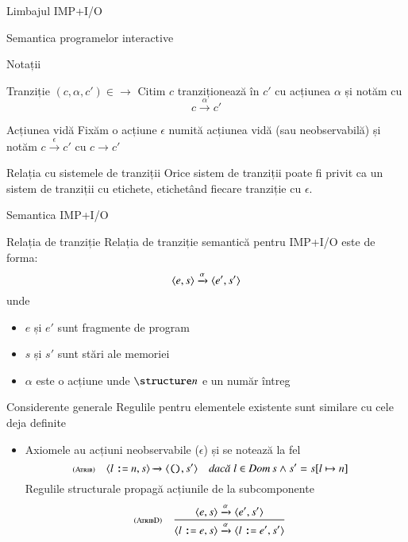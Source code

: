 \documentclass[xcolor=pdftex,romanian,colorlinks]{beamer}
\begin{document}
\begin{section}{Limbajul IMP+I/O}
\begin{subsection}{Semantica programelor interactive}
\begin{frame}{Notații}
\begin{block}{Tranziție $(c,\alpha,c') \in \rightarrow$} 
Citim $c$ tranziționează în $c'$ cu acțiunea $\alpha$ și notăm cu
\[c \xrightarrow{\alpha} c'\]
\end{block}

\begin{block}{Acțiunea vidă}
Fixăm o acțiune $\epsilon$ numită acțiunea vidă (sau neobservabilă) și notăm  $c \xrightarrow{\epsilon} c'$ cu $c \rightarrow c'$
\end{block}

\begin{block}{Relația cu sistemele de tranziții}
Orice sistem de tranziții poate fi privit ca un sistem de tranziții cu etichete, etichetând fiecare tranziție cu $\epsilon$.
\end{block}

\end{frame}
\end{subsection}

\begin{subsection}{Semantica IMP+I/O}
\begin{frame}{Relația de tranziție}
Relația de tranziție semantică pentru IMP+I/O este de forma:
\[{\langle{e,s}\rangle}\xrightarrow{\alpha}{\langle{e',s'}\rangle}\]
unde
\begin{itemize}
\item $e$ și $e'$ sunt fragmente de program
\item $s$ și $s'$ sunt stări ale memoriei 
\item $\alpha$ este o acțiune
\alert{
\renewcommand{\syntaxKeyword}{}
\syntax[\structure{\alpha}]{\epsilon \Smid \Sget(\Int) \Smid \Sput(\Int)}{}
}
unde $\Int$ e un număr întreg
\end{itemize}
\end{frame}

\begin{frame}{Considerente generale}
Regulile pentru elementele existente sunt similare cu cele deja definite
\begin{itemize}
\item Axiomele au acțiuni neobservabile ($\epsilon$) și se notează la fel
\[\reg[Atrib]{\Ss{\c{l \terminal{:=} n,s}}{\c{\Sskip,s'}}}{}{l\in \Dom s \wedge s'=s[l \mapsto n]}\]
\vitem Regulile structurale propagă acțiunile de la subcomponente
\[
\reg[AtribD]{\Ss[\alpha]{\c{l \terminal{:=} e ,s}}{\c{l \terminal{:=} e' ,s'}}}{\Ss[\alpha]{\c{e,s}}{\c{e',s'}}}{}
\]
\end{itemize}
\end{frame}


\end{subsection}
\end{section}
\end{document}
